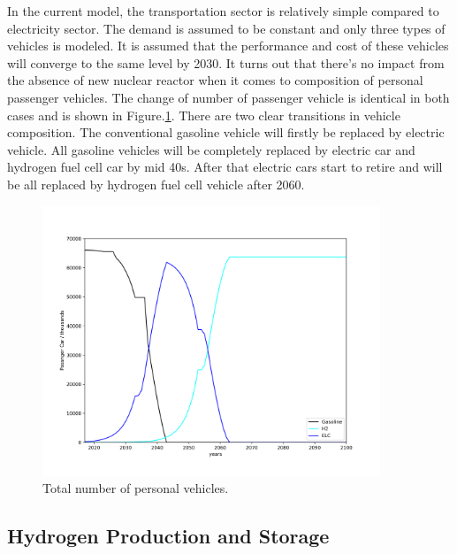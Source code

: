 \documentclass[14pt,a4paper]{article} %
\begin{document}
In the current model, the transportation sector is relatively simple compared to electricity sector. The demand is assumed to be constant and only three types of vehicles is modeled. It is assumed that the performance and cost of these vehicles will converge to the same level by 2030. It turns out that there's no impact from the absence of new nuclear reactor when it comes to composition of personal passenger vehicles. The change of number of passenger vehicle is identical in both cases and is shown in Figure.\ref{fig:nonuccar}.
There are two clear transitions in vehicle composition. The conventional gasoline vehicle will firstly be replaced by electric vehicle. All gasoline vehicles will be completely replaced by electric car and hydrogen fuel cell car by mid 40s. After that electric cars start to retire and will be all replaced by hydrogen fuel cell vehicle after 2060.


\begin{figure}[H]
  \centering
    \includegraphics[width=0.9\textwidth]{./plot/nonuc_car.png}
  \caption{Total number of personal vehicles.}
  \label{fig:nonuccar}
\end{figure}


\subsection{Hydrogen Production and Storage}
\label{sec:hydrogen production}
\end{document}

